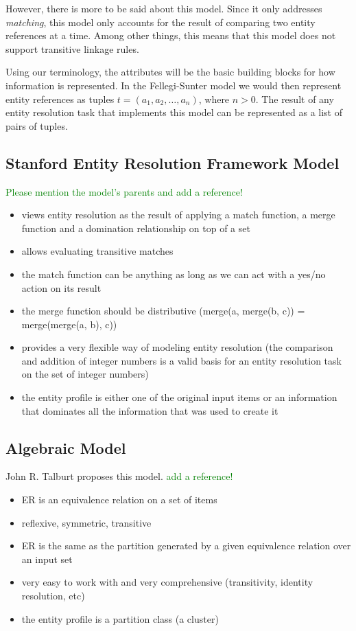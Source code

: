 \documentclass[11pt]{article}
\begin{document}
    However, there is more to be said about this model.
    Since it only addresses \textit{matching}, this model only accounts for
    the result of comparing two entity references at a time\cite{Kon19}.
    Among other things, this means that this model does not support transitive
    linkage rules\cite{Tal11}.

    Using our terminology, the attributes will be the basic building blocks for
    how information is represented.
    In the Fellegi-Sunter model we would then represent entity references as
    tuples $t=(a_1,a_2,\ldots,a_n)$, where $n>0$.
    The result of any entity resolution task that implements this model can be
    represented as a list of pairs of tuples.
    
    \subsection[serf]{Stanford Entity Resolution Framework Model}\label{subsec:serf}

    \textcolor{green}{Please mention the model's parents and add a reference!}
    \begin{itemize}
        \item views entity resolution as the result of applying a match function, a merge function and a domination relationship on top of a set
        \item allows evaluating transitive matches
        \item the match function can be anything as long as we can act with a yes/no action on its result
        \item the merge function should be distributive (merge(a, merge(b, c)) = merge(merge(a, b), c))
        \item provides a very flexible way of modeling entity resolution (the comparison and addition of integer numbers is a valid basis for an entity resolution task on the set of integer numbers)
        \item the entity profile is either one of the original input items or an information that dominates all the information that was used to create it
    \end{itemize}

    \subsection[algebraic]{Algebraic Model}\label{subsec:algebraic}

    John R. Talburt proposes this model. 
    \textcolor{green}{add a reference!}
    \begin{itemize}
        \item ER is an equivalence relation on a set of items
        \item reflexive, symmetric, transitive
        \item ER is the same as the partition generated by a given equivalence relation over an input set
        \item very easy to work with and very comprehensive (transitivity, identity resolution, etc)
        \item the entity profile is a partition class (a cluster)
    \end{itemize}
\end{document}
